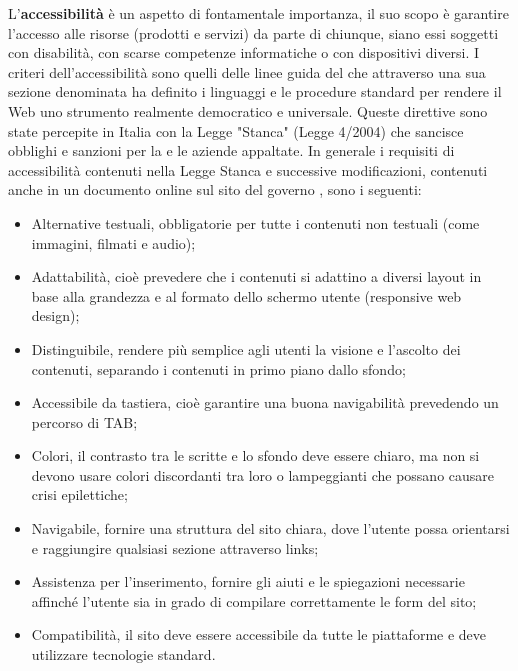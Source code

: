 L'\textbf{accessibilità} è un aspetto di fontamentale importanza, il suo scopo è garantire l'accesso alle risorse (prodotti e servizi) da parte di chiunque, siano essi soggetti con disabilità, con scarse competenze informatiche o con dispositivi diversi.
I criteri dell'accessibilità sono quelli delle linee guida del  che attraverso una sua sezione denominata  ha definito i linguaggi e le procedure standard per rendere il Web uno strumento realmente democratico e universale.
Queste direttive sono state percepite in Italia con la Legge "Stanca" (Legge 4/2004) che sancisce obblighi e sanzioni per la  e le aziende appaltate.
In generale i requisiti di accessibilità contenuti nella Legge Stanca e successive modificazioni, contenuti anche in un documento online sul sito del governo , sono i seguenti:
\begin{itemize}
    \item Alternative testuali, obbligatorie per tutte i contenuti non testuali (come immagini, filmati e audio);
    \item Adattabilità, cioè prevedere che i contenuti si adattino a diversi layout in base alla grandezza e al formato dello schermo utente (responsive web design);
    \item Distinguibile, rendere più semplice agli utenti la visione e l'ascolto dei contenuti, separando i contenuti in primo piano dallo sfondo;
    \item Accessibile da tastiera, cioè garantire una buona navigabilità prevedendo un percorso di TAB;
    \item Colori, il contrasto tra le scritte e lo sfondo deve essere chiaro, ma non si devono usare colori discordanti tra loro o lampeggianti che possano causare crisi epilettiche;
    \item Navigabile, fornire una struttura del sito chiara, dove l'utente possa orientarsi e raggiungire qualsiasi sezione attraverso links;
    \item Assistenza per l'inserimento, fornire gli aiuti e le spiegazioni necessarie affinché l'utente sia in grado di compilare correttamente le form del sito;
    \item Compatibilità, il sito deve essere accessibile da tutte le piattaforme e deve utilizzare tecnologie standard.
\end{itemize}


